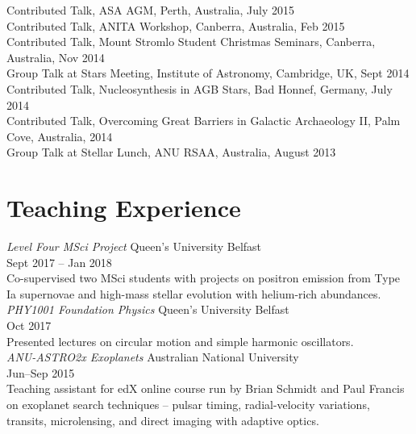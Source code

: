 \documentclass[11pt]{res} %
\begin{document}
\begin{resume}
  Contributed Talk, ASA AGM, Perth, Australia, July 2015\\
  Contributed Talk, ANITA Workshop, Canberra, Australia, Feb 2015\\
  Contributed Talk, Mount Stromlo Student Christmas Seminars, Canberra, Australia, Nov 2014\\
  Group Talk at Stars Meeting, Institute of Astronomy, Cambridge, UK, Sept 2014\\
  Contributed Talk, Nucleosynthesis in AGB Stars, Bad Honnef, Germany, July 2014\\
  Contributed Talk, Overcoming Great Barriers in Galactic Archaeology II, Palm Cove, Australia, 2014\\
  Group Talk at Stellar Lunch, ANU RSAA, Australia, August 2013\\

\section{Teaching Experience}
  {\it Level Four MSci Project} \hfill Queen's University Belfast\\
  \null\hfill Sept 2017 -- Jan 2018\\
  Co-supervised two MSci students with projects on positron emission from Type Ia supernovae
  and high-mass stellar evolution with helium-rich abundances.\\

  {\it PHY1001 Foundation Physics} \hfill Queen's University Belfast\\
  \null\hfill Oct 2017\\
  Presented lectures on circular motion and simple harmonic oscillators.\\

  {\it ANU-ASTRO2x Exoplanets} \hfill Australian National University\\
  \null\hfill Jun--Sep 2015\\
  Teaching assistant for edX online course run by Brian Schmidt and Paul Francis on exoplanet search techniques -- pulsar timing, radial-velocity variations, transits, microlensing, and direct imaging with adaptive optics.\\


\end{resume}
\end{document}
